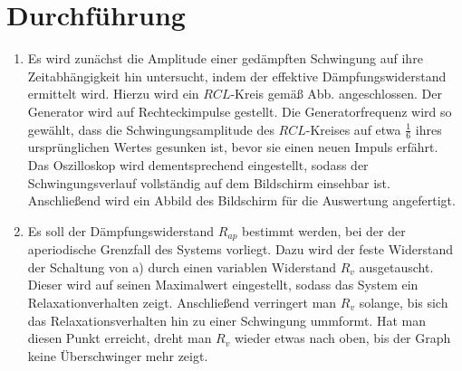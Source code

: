 \section{Durchführung}
\label{sec:Durchführung}
\renewcommand{\labelenumi}{\alph{enumi})}
\begin{enumerate}
\item Es wird zunächst die Amplitude einer gedämpften Schwingung auf ihre Zeitabhängigkeit hin untersucht, indem
 der effektive Dämpfungswiderstand ermittelt wird. Hierzu wird ein $RCL$-Kreis gemäß
 Abb.  angeschlossen. Der Generator wird auf Rechteckimpulse gestellt.
  Die Generatorfrequenz wird so gewählt, dass die Schwingungsamplitude des $RCL$-Kreises auf etwa $\frac{1}{6}$
   ihres ursprünglichen Wertes gesunken ist, bevor sie einen neuen Impuls erfährt. Das Oszilloskop
    wird dementsprechend eingestellt, sodass der Schwingungsverlauf vollständig auf dem Bildschirm einsehbar ist.
    Anschließend wird ein Abbild des Bildschirm für die Auswertung angefertigt.

     \item Es soll der Dämpfungswiderstand $R_{ap}$ bestimmt werden, bei der der aperiodische Grenzfall des Systems vorliegt.
     Dazu wird der feste Widerstand der Schaltung von a) durch einen variablen Widerstand $R_v$
     ausgetauscht. Dieser wird auf seinen Maximalwert eingestellt, sodass das System ein Relaxationverhalten zeigt.
      Anschließend verringert man $R_v$ solange, bis sich das Relaxationsverhalten hin zu einer Schwingung ummformt.
      Hat man diesen Punkt erreicht, dreht man $R_v$ wieder etwas nach oben, bis der Graph keine Überschwinger mehr zeigt.


\end{enumerate}
